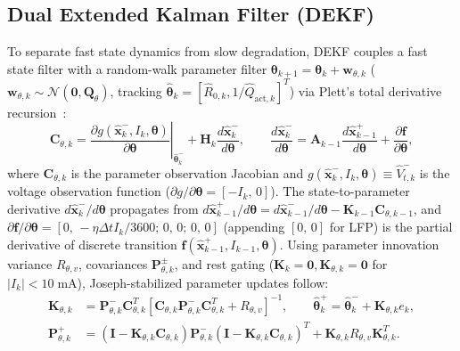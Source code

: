 \documentclass[10pt,a4paper]{article}
\begin{document}
\subsection{Dual Extended Kalman Filter (DEKF)}
To separate fast state dynamics from slow degradation, DEKF couples a fast state filter with a random-walk parameter filter $\boldsymbol{\theta}_{k+1} = \boldsymbol{\theta}_k + \mathbf{w}_{\theta,k}$ ($\mathbf{w}_{\theta,k} \sim \mathcal{N}(\mathbf{0}, \mathbf{Q}_\theta)$, tracking $\hat{\boldsymbol{\theta}}_k = [\hat{R}_{0,k}, 1/\hat{Q}_{\text{act},k}]^T$) via Plett's total derivative recursion~\cite{Plett2004part3}:
\begin{equation}\label{eqn:dekf_param_jacobian}
\mathbf{C}_{\theta,k} = \left.\frac{\partial g(\hat{\mathbf{x}}_k^-, I_k, \boldsymbol{\theta})}{\partial \boldsymbol{\theta}}\right|_{\hat{\boldsymbol{\theta}}_k^-} + \mathbf{H}_k \frac{d\hat{\mathbf{x}}_k^-}{d\boldsymbol{\theta}}, \qquad
\frac{d\hat{\mathbf{x}}_k^-}{d\boldsymbol{\theta}} = \mathbf{A}_{k-1} \frac{d\hat{\mathbf{x}}_{k-1}^+}{d\boldsymbol{\theta}} + \frac{\partial \mathbf{f}}{\partial \boldsymbol{\theta}},
\end{equation}
where $\mathbf{C}_{\theta,k}$ is the parameter observation Jacobian and $g(\hat{\mathbf{x}}_k^-, I_k, \boldsymbol{\theta}) \equiv \hat{V}_{t,k}^-$ is the voltage observation function ($\partial g/\partial\boldsymbol{\theta} = [-I_k,\, 0]$). The state-to-parameter derivative $d\hat{\mathbf{x}}_k^-/d\boldsymbol{\theta}$ propagates from $d\hat{\mathbf{x}}_{k-1}^+/d\boldsymbol{\theta} = d\hat{\mathbf{x}}_{k-1}^-/d\boldsymbol{\theta} - \mathbf{K}_{k-1}\mathbf{C}_{\theta,k-1}$, and $\partial \mathbf{f}/\partial \boldsymbol{\theta} = [0,\, -\eta\Delta t I_k/3600;\, 0,\, 0;\, 0,\, 0]$ (appending $[0,\, 0]$ for LFP) is the partial derivative of discrete transition $\mathbf{f}(\hat{\mathbf{x}}_{k-1}^+, I_{k-1}, \boldsymbol{\theta})$. Using parameter innovation variance $R_{\theta,v}$, covariances $\mathbf{P}_{\theta,k}^\pm$, and rest gating ($\mathbf{K}_k = \mathbf{0}, \mathbf{K}_{\theta,k} = \mathbf{0}$ for $|I_k| < 10\;\mathrm{mA}$), Joseph-stabilized parameter updates follow:
\begin{align}\label{eqn:dekf_param_cov}
\mathbf{K}_{\theta,k} &= \mathbf{P}_{\theta,k}^- \mathbf{C}_{\theta,k}^T [ \mathbf{C}_{\theta,k} \mathbf{P}_{\theta,k}^- \mathbf{C}_{\theta,k}^T + R_{\theta,v} ]^{-1}, \qquad
\hat{\boldsymbol{\theta}}_k^+ = \hat{\boldsymbol{\theta}}_k^- + \mathbf{K}_{\theta,k} e_k, \nonumber\\
\mathbf{P}_{\theta,k}^+ &= (\mathbf{I} - \mathbf{K}_{\theta,k} \mathbf{C}_{\theta,k}) \mathbf{P}_{\theta,k}^- (\mathbf{I} - \mathbf{K}_{\theta,k} \mathbf{C}_{\theta,k})^T + \mathbf{K}_{\theta,k} R_{\theta,v} \mathbf{K}_{\theta,k}^T.
\end{align}
\end{document}
